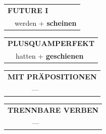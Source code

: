 \documentclass[10pt,a4paper]{revtex4-2}
\begin{document}
\begin{verbbox}
\begin{tabular}{rl}
    \multicolumn{2}{l}{\textbf{FUTURE I} }\\
  &  werden + \textbf{scheinen}\\
 
  \end{tabular}
\hfill
   \begin{tabular}{rl}
      \multicolumn{2}{l}{\textbf{PLUSQUAMPERFEKT}}\\
  &  hatten + \textbf{geschienen}\\
  \end{tabular}
  
  \vspace{10pt}



\begin{tabular}{lll}
\multicolumn{3}{l}{\textbf{MIT PRÄPOSITIONEN}}\\
& ---\\
\end{tabular}
\hfill
\begin{tabular}{lll}
\multicolumn{3}{l}{\textbf{TRENNBARE VERBEN}}\\
& ---\\
\end{tabular}

\vspace{-5pt}

\end{verbbox}
\end{document}
